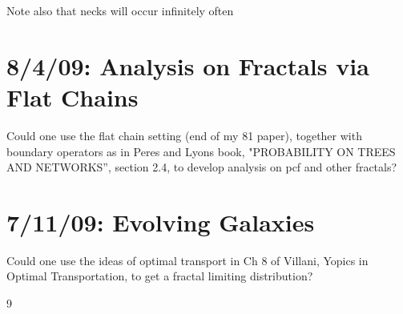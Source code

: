 \documentclass[a4paper]{amsart}
\theoremstyle{plain}
\theoremstyle{definition}
\theoremstyle{remark}
\begin{document}
Note also that necks will occur infinitely often



\section{\textbf{8/4/09: Analysis on Fractals via Flat Chains}} 

Could one use the flat chain setting (end of my 81 paper), together  with boundary operators as in Peres and Lyons book, "PROBABILITY ON TREES  AND NETWORKS'', section 2.4, to develop analysis on pcf and other fractals?


\section{\textbf{7/11/09: Evolving Galaxies}} 

Could one use the ideas of optimal transport in Ch 8 of Villani, Yopics in Optimal Transportation,  to get a fractal limiting distribution?

\begin{thebibliography}{9} 





\end{thebibliography} 
\end{document}
